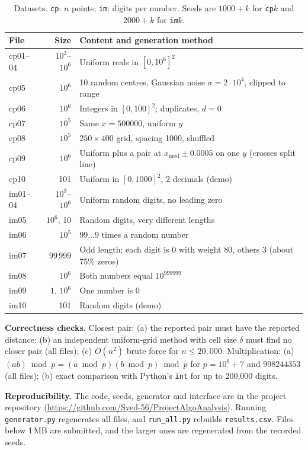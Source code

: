 \documentclass[10pt,twocolumn]{article}
\begin{document}
\begin{table}[h]
\centering\footnotesize\setlength{\tabcolsep}{2.5pt}
\caption{Datasets. \texttt{cp}: $n$ points; \texttt{im}: digits per number. Seeds are $1000{+}k$ for \texttt{cp}$k$ and $2000{+}k$ for \texttt{im}$k$.}\label{tab:data}
\begin{tabular}{@{}l r p{5.6cm}@{}}
\toprule
File & Size & Content and generation method\\\midrule
cp01--04 & $10^3$--$10^6$ & Uniform reals in $[0,10^6]^2$\\
cp05 & $10^6$ & 10 random centres, Gaussian noise $\sigma{=}2{\cdot}10^4$, clipped to range\\
cp06 & $10^6$ & Integers in $[0,100]^2$; duplicates, $d{=}0$\\
cp07 & $10^5$ & Same $x{=}500000$, uniform $y$\\
cp08 & $10^5$ & $250{\times}400$ grid, spacing 1000, shuffled\\
cp09 & $10^6$ & Uniform plus a pair at $x_{\text{med}}\pm0.0005$ on one $y$ (crosses split line)\\
cp10 & 101 & Uniform in $[0,1000]^2$, 2 decimals (demo)\\\midrule
im01--04 & $10^3$--$10^6$ & Uniform random digits, no leading zero\\
im05 & $10^6$, 10 & Random digits, very different lengths\\
im06 & $10^5$ & $99\ldots9$ times a random number\\
im07 & 99\,999 & Odd length; each digit is 0 with weight 80, others 3 (about 75\% zeros)\\
im08 & $10^6$ & Both numbers equal $10^{999999}$\\
im09 & $1$, $10^6$ & One number is 0\\
im10 & 101 & Random digits (demo)\\\bottomrule
\end{tabular}
\end{table}

\textbf{Correctness checks.} Closest pair: (a) the reported pair must have the reported distance; (b) an independent uniform-grid method with cell size $\delta$ must find no closer pair (all files); (c) $O(n^2)$ brute force for $n\le 20{,}000$. Multiplication: (a) $(ab)\bmod p=(a\bmod p)(b\bmod p)\bmod p$ for $p=10^9{+}7$ and $998244353$ (all files); (b) exact comparison with Python's \texttt{int} for up to 200{,}000 digits.

\textbf{Reproducibility.} The code, seeds, generator and interface are in the project repository (\url{https://github.com/Syed-56/ProjectAlgoAnalysis}). Running \texttt{generator.py} regenerates all files, and \texttt{run\_all.py} rebuilds \texttt{results.csv}. Files below 1\,MB are submitted, and the larger ones are regenerated from the recorded seeds.
\end{document}

